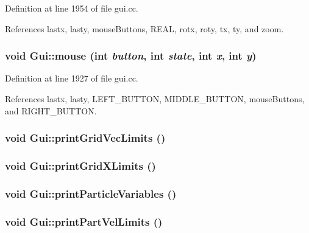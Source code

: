 Definition at line 1954 of file gui.cc.

References lastx, lasty, mouseButtons, REAL, rotx, roty, tx, ty, and zoom.\hypertarget{namespaceGui_3971df0804b9da39b2c9a1b40f708b50}{
\subsubsection[{mouse}]{\setlength{\rightskip}{0pt plus 5cm}void Gui::mouse (int {\em button}, \/  int {\em state}, \/  int {\em x}, \/  int {\em y})}}
\label{namespaceGui_3971df0804b9da39b2c9a1b40f708b50}




Definition at line 1927 of file gui.cc.

References lastx, lasty, LEFT\_\-BUTTON, MIDDLE\_\-BUTTON, mouseButtons, and RIGHT\_\-BUTTON.\hypertarget{namespaceGui_1bcce63e80eb6c25379b1902623ae885}{
\subsubsection[{printGridVecLimits}]{\setlength{\rightskip}{0pt plus 5cm}void Gui::printGridVecLimits ()}}
\label{namespaceGui_1bcce63e80eb6c25379b1902623ae885}


\hypertarget{namespaceGui_193a20479572ecdce2ba9826ea1afa52}{
\subsubsection[{printGridXLimits}]{\setlength{\rightskip}{0pt plus 5cm}void Gui::printGridXLimits ()}}
\label{namespaceGui_193a20479572ecdce2ba9826ea1afa52}


\hypertarget{namespaceGui_b12854bedf083987e0815e02f599ec45}{
\subsubsection[{printParticleVariables}]{\setlength{\rightskip}{0pt plus 5cm}void Gui::printParticleVariables ()}}
\label{namespaceGui_b12854bedf083987e0815e02f599ec45}


\hypertarget{namespaceGui_a532192f836051be770c02dfd5b54379}{
\subsubsection[{printPartVelLimits}]{\setlength{\rightskip}{0pt plus 5cm}void Gui::printPartVelLimits ()}}
\label{namespaceGui_a532192f836051be770c02dfd5b54379}


